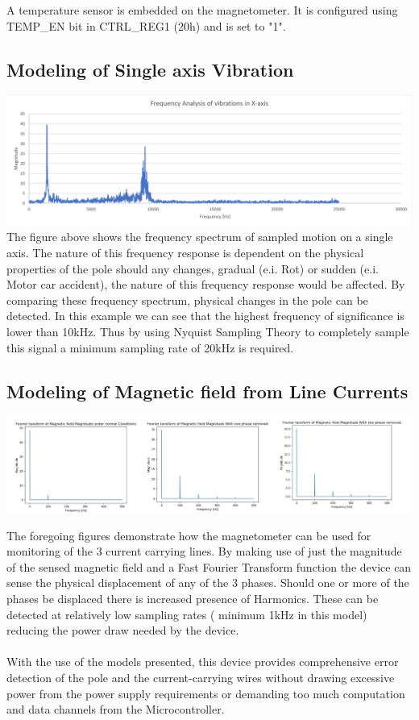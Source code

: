 \documentclass[12pt]{article}
\begin{document}
A temperature sensor is embedded on the magnetometer. It is configured using \\ TEMP\_EN bit in CTRL\_REG1 (20h) and 
is set to "1". 


\subsection{Modeling of Single axis Vibration}
\includegraphics[scale = 0.5]{XaxisVibrations.PNG} 
\\The figure above shows the frequency spectrum of sampled motion on  a single axis. 
The nature of this frequency response is dependent on the physical properties of the pole should any changes, 
gradual (e.i. Rot) or sudden (e.i. Motor car accident), the nature of this frequency response would be affected. 
By comparing these frequency spectrum, physical changes in the pole can be detected. 
In this example we can see that the highest frequency of significance is lower than 10kHz. 
Thus by using Nyquist Sampling Theory to completely sample this signal a minimum sampling rate of 20kHz is required. 


\subsection[]{Modeling of Magnetic field from Line Currents}
\includegraphics[scale = 0.45]{MagneticFFT.PNG}

The foregoing figures demonstrate how the magnetometer can be used for monitoring of the 3 current carrying lines. 
By making use of just the magnitude of the sensed magnetic field and a Fast Fourier Transform function the device can 
sense the physical displacement of any of the 3 phases. Should one or more of the phases be displaced there is increased
presence of Harmonics. These can be detected at relatively low sampling rates ( minimum 1kHz in this model) reducing the
power draw needed by the device. 
\\ 
\\
With the use of the models presented, this device provides comprehensive error detection of the pole and the 
current-carrying wires without drawing excessive power from the power supply requirements or demanding too much 
computation and data channels  from  the Microcontroller. 
\end{document}
